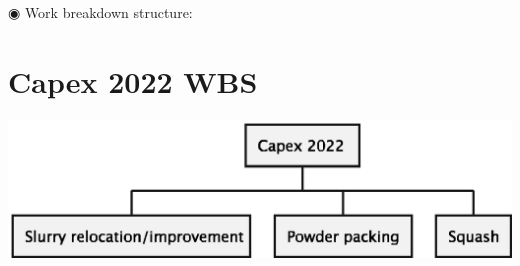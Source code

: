 \documentclass[11pt]{article}
\author{Ricardo Antunes}
\date{\today}
\title{}
\begin{document}
\tableofcontents

◉ Work breakdown structure:
\section{Capex 2022 WBS}
\label{sec:org0133a4f}


\label{fig_wbs}
\begin{center}
\includegraphics[width=.9\linewidth]{Resources/wbs.eps}
\end{center}
\end{document}
